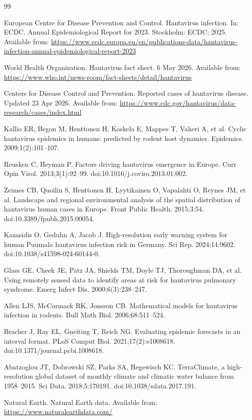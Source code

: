 \documentclass[11pt]{article}
\begin{document}
\sloppy
\begin{thebibliography}{99}

European Centre for Disease Prevention and Control. Hantavirus infection. In: ECDC. Annual Epidemiological Report for 2023. Stockholm: ECDC; 2025. Available from: \url{https://www.ecdc.europa.eu/en/publications-data/hantavirus-infection-annual-epidemiological-report-2023}

World Health Organization. Hantavirus fact sheet. 6 May 2026. Available from: \url{https://www.who.int/news-room/fact-sheets/detail/hantavirus}

Centers for Disease Control and Prevention. Reported cases of hantavirus disease. Updated 23 Apr 2026. Available from: \url{https://www.cdc.gov/hantavirus/data-research/cases/index.html}

Kallio ER, Begon M, Henttonen H, Koskela E, Mappes T, Vaheri A, et al. Cyclic hantavirus epidemics in humans: predicted by rodent host dynamics. Epidemics. 2009;1(2):101--107.

Reusken C, Heyman P. Factors driving hantavirus emergence in Europe. Curr Opin Virol. 2013;3(1):92--99. doi:10.1016/j.coviro.2013.01.002.

Zeimes CB, Quoilin S, Henttonen H, Lyytikainen O, Vapalahti O, Reynes JM, et al. Landscape and regional environmental analysis of the spatial distribution of hantavirus human cases in Europe. Front Public Health. 2015;3:54. doi:10.3389/fpubh.2015.00054.

Kazasidis O, Geduhn A, Jacob J. High-resolution early warning system for human Puumala hantavirus infection risk in Germany. Sci Rep. 2024;14:9602. doi:10.1038/s41598-024-60144-0.

Glass GE, Cheek JE, Patz JA, Shields TM, Doyle TJ, Thoroughman DA, et al. Using remotely sensed data to identify areas at risk for hantavirus pulmonary syndrome. Emerg Infect Dis. 2000;6(3):238--247.

Allen LJS, McCormack RK, Jonsson CB. Mathematical models for hantavirus infection in rodents. Bull Math Biol. 2006;68:511--524.

Bracher J, Ray EL, Gneiting T, Reich NG. Evaluating epidemic forecasts in an interval format. PLoS Comput Biol. 2021;17(2):e1008618. doi:10.1371/journal.pcbi.1008618.

Abatzoglou JT, Dobrowski SZ, Parks SA, Hegewisch KC. TerraClimate, a high-resolution global dataset of monthly climate and climatic water balance from 1958--2015. Sci Data. 2018;5:170191. doi:10.1038/sdata.2017.191.

Natural Earth. Natural Earth data. Available from: \url{https://www.naturalearthdata.com/}

\end{thebibliography}
\end{document}
